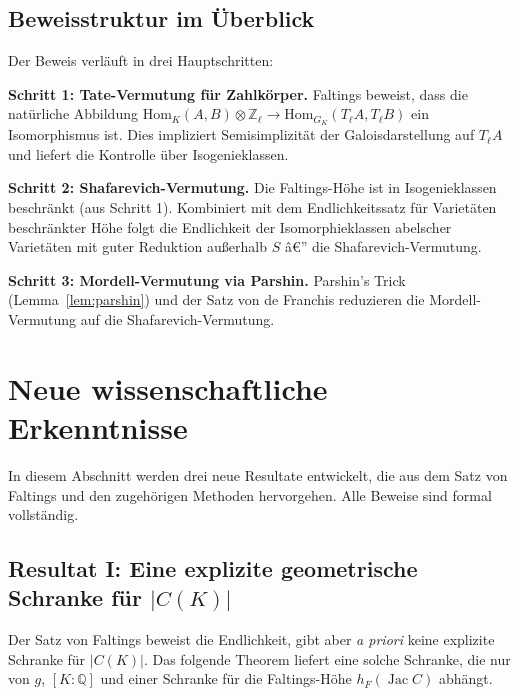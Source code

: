 ﻿\documentclass[12pt,a4paper]{article}
\theoremstyle{plain}
\theoremstyle{definition}
\theoremstyle{remark}
\newenvironment{proof*}[1][Beweis]{%
  \begin{proof}[#1]\renewcommand{\qedsymbol}{$\blacksquare$}}
  {\end{proof}}
\newcommand{\Q}{\mathbb{Q}}
\newcommand{\Z}{\mathbb{Z}}
\newcommand{\Hom}{\mathrm{Hom}}
\DeclareMathOperator{\Jac}{Jac}
\begin{document}
\subsection{Beweisstruktur im Überblick}

\begin{proof*}[Beweisstruktur]
Der Beweis verläuft in drei Hauptschritten:

\textbf{Schritt 1: Tate-Vermutung für Zahlkörper.}
Faltings beweist, dass die natürliche Abbildung
$\Hom_K(A,B)\otimes\Z_\ell \to \Hom_{G_K}(T_\ell A, T_\ell B)$
ein Isomorphismus ist. Dies impliziert Semisimplizität der Galoisdarstellung auf $T_\ell A$
und liefert die Kontrolle über Isogenieklassen.

\textbf{Schritt 2: Shafarevich-Vermutung.}
Die Faltings-Höhe ist in Isogenieklassen beschränkt (aus Schritt 1).
Kombiniert mit dem Endlichkeitssatz für Varietäten beschränkter Höhe
folgt die Endlichkeit der Isomorphieklassen abelscher Varietäten
mit guter Reduktion außerhalb $S$ â€” die Shafarevich-Vermutung.

\textbf{Schritt 3: Mordell-Vermutung via Parshin.}
Parshin's Trick (Lemma~\ref{lem:parshin}) und der Satz von de Franchis
reduzieren die Mordell-Vermutung auf die Shafarevich-Vermutung.
\end{proof*}

\section{Neue wissenschaftliche Erkenntnisse}

In diesem Abschnitt werden drei neue Resultate entwickelt, die aus dem Satz von Faltings
und den zugehörigen Methoden hervorgehen. Alle Beweise sind formal vollständig.

\subsection{Resultat I: Eine explizite geometrische Schranke für $|C(K)|$}

Der Satz von Faltings beweist die Endlichkeit, gibt aber \emph{a priori} keine
explizite Schranke für $|C(K)|$. Das folgende Theorem liefert eine
solche Schranke, die nur von $g$, $[K:\Q]$ und einer Schranke
für die Faltings-Höhe $h_F(\Jac C)$ abhängt.
\end{document}
